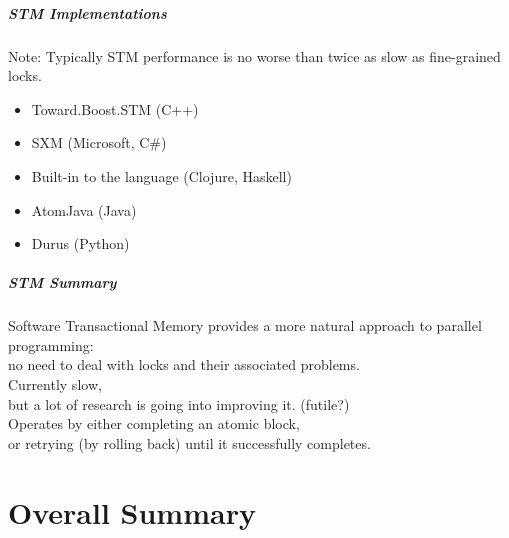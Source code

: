 \documentclass[aspectratio=43]{beamer}
\newenvironment{changemargin}[1]{%
  \begin{list}{}{%
    \setlength{\topsep}{0pt}%
    \setlength{\leftmargin}{#1}%
    \setlength{\rightmargin}{1em}
    \setlength{\listparindent}{\parindent}%
    \setlength{\itemindent}{\parindent}%
    \setlength{\parsep}{\parskip}%
  }%
  \item[]}{\end{list}}
\begin{document}
\begin{frame}
  \frametitle{STM Implementations}

\begin{changemargin}{2cm}

  Note: Typically STM performance is no worse than twice as slow as
  fine-grained locks.

  \begin{itemize}
    \item Toward.Boost.STM (C++)

    \item SXM (Microsoft, C\#)

    \item Built-in to the language (Clojure, Haskell)

    \item AtomJava (Java)

    \item Durus (Python)
  \end{itemize}
\end{changemargin}
\end{frame}

\begin{frame}
  \frametitle{STM Summary}

\begin{changemargin}{1cm}
     Software Transactional Memory provides a more natural approach to
      parallel programming: \\ \qquad no need to deal with locks and their associated problems.\\[1em]

     Currently slow,\\ \qquad but a lot of research is going into improving it. (futile?)\\[1em]

     Operates by either completing an atomic block,\\ or retrying (by rolling
      back) until it successfully completes.
\end{changemargin}
\end{frame}
\part{Overall Summary}
\frame{\partpage}
\end{document}
